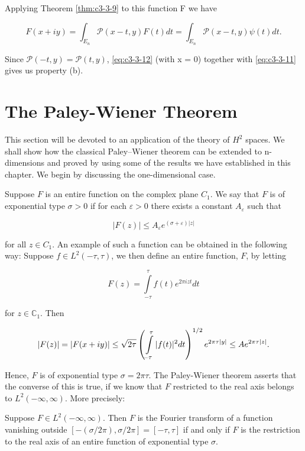 Applying Theorem \ref{thm:c3-3-9} to this function F we have

\begin{equation}\label{eq:c3-3-12}
F(x+i y)=\int_{E_{n}}\mathcal{P}(x-t,y)F(t)d t=\int_{E_{n}}\mathcal{P}(x-t,y)\psi(t)d t.
\end{equation}

Since $\mathcal{P}(-t,y) = \mathcal{P}(t,y)$, \eqref{eq:c3-3-12} (with x = 0) together with \eqref{eq:c3-3-11} gives us property (b).

\section{The Paley-Wiener Theorem}

This section will be devoted to an application of the theory of $H^{2}$ spaces. We shall show how the classical Paley--Wiener theorem can be extended to n-dimensions and proved by using some of the results we have established in this chapter. We begin by discussing the one-dimensional case.

Suppose $F$ is an entire function on the complex plane $C_1$. We say that $F$ is of exponential type $\sigma > 0$ if for each $\varepsilon > 0$ there exists a constant $A_\varepsilon$ such that

\[
\left|F(z)\right|\leq A_{\varepsilon}e^{(\sigma+\varepsilon)|z|}
\]

for all $z \in C_1$. An example of such a function can be obtained in the following way: Suppose $f \in L^2(-\tau, \tau)$, we then define an entire function, $F$, by letting

\[
F(z)=\int\limits_{-\tau}^{\tau}f(t)e^{2\pi i z t}d t
\]

for $z \in \mathbb{C}_1$. Then

\[
|F(z)|=|F(x+i y)|\leq\sqrt{2\tau}\left(\intop_{-\tau}^{\tau}|f(t)|^{2}d t\right)^{1/2}e^{2\pi\tau|y|}\leq A e^{2\pi\tau|z|}.
\]

Hence, $F$ is of exponential type $\sigma = 2\pi\tau$. The Paley-Wiener theorem asserts that the converse of this is true, if we know that $F$ restricted to the real axis belongs to $L^{2}(-\infty, \infty)$. More precisely:

\begin{theorem}
\label{thm:c3-4-1}
Suppose $F \in L^2(-\infty, \infty)$. Then $F$ is the Fourier transform of a function vanishing outside $[-(\sigma/2\pi), \sigma/2\pi] = [-\tau, \tau]$ if and only if $F$ is the restriction to the real axis of an entire function of exponential type $\sigma$.
\end{theorem}

